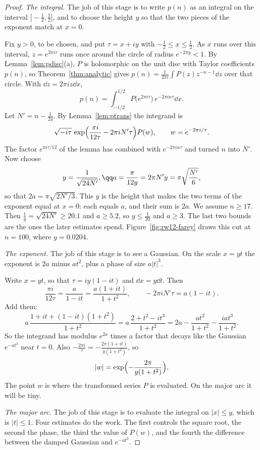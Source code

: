 \begin{proof}
\emph{The integral.} The job of this stage is to write $p(n)$ as an integral on the interval $\bigl[-\frac12,\frac12\bigr]$, and to choose the height $y$ so that the two pieces of the exponent match at $x=0$.

Fix $y>0$, to be chosen, and put $\tau=x+iy$ with $-\frac12\le x\le\frac12$. As $x$ runs over this interval, $z=e^{2\pi i\tau}$ runs once around the circle of radius $e^{-2\pi y}<1$. By Lemma~\ref{lem:pdisc}(a), $P$ is holomorphic on the unit disc with Taylor coefficients $p(n)$, so Theorem~\ref{thm:analytic} gives $p(n)=\frac1{2\pi i}\int P(z)z^{-n-1}\dd z$ over that circle. With $\dd z=2\pi iz\dd x$,
\[
p(n)=\int_{-1/2}^{1/2}P\bigl(e^{2\pi i\tau}\bigr)\,e^{-2\pi in\tau}\dd x.
\]
Let $N'=n-\frac1{24}$. By Lemma~\ref{lem:ptrans} the integrand is
\[
\sqrt{-i\tau}\,\exp\Bigl(\frac{\pi i}{12\tau}-2\pi iN'\tau\Bigr)P(w),\qquad w=e^{-2\pi i/\tau}.
\]
The factor $e^{\pi i\tau/12}$ of the lemma has combined with $e^{-2\pi in\tau}$ and turned $n$ into $N'$. Now choose
\[
y=\frac1{\sqrt{24N'}},\qq a=\frac\pi{12y}=2\pi N'y=\pi\sqrt{\frac{N'}6},
\]
so that $2a=\pi\sqrt{2N'/3}$. This $y$ is the height that makes the two terms of the exponent equal at $x=0$: each equals $a$, and their sum is $2a$. We assume $n\ge17$. Then $\frac1y=\sqrt{24N'}\ge20.1$ and $a\ge5.2$, so $y\le\frac1{20}$ and $a\ge3$. The last two bounds are the ones the later estimates spend. Figure~\ref{fig:rw12-farey} draws this cut at $n=100$, where $y=0.0204$.

\emph{The exponent.} The job of this stage is to see a Gaussian. On the scale $x=yt$ the exponent is $2a$ minus $at^2$, plus a phase of size $a|t|^3$.

Write $x=yt$, so that $\tau=iy(1-it)$ and $\dd x=y\dd t$. Then
\[
\frac{\pi i}{12\tau}=\frac a{1-it}=\frac{a(1+it)}{1+t^2},\qquad-2\pi iN'\tau=a(1-it).
\]
Add them:
\[
a\,\frac{1+it+(1-it)(1+t^2)}{1+t^2}=a\,\frac{2+t^2-it^3}{1+t^2}=2a-\frac{at^2}{1+t^2}-\frac{iat^3}{1+t^2}.
\]
So the integrand has modulus $e^{2a}$ times a factor that decays like the Gaussian $e^{-at^2}$ near $t=0$. Also $-\frac{2\pi i}\tau=-\frac{2\pi(1+it)}{y(1+t^2)}$, so
\[
|w|=\exp\Bigl(-\frac{2\pi}{y(1+t^2)}\Bigr).
\]
The point $w$ is where the transformed series $P$ is evaluated. On the major arc it will be tiny.

\emph{The major arc.} The job of this stage is to evaluate the integral on $|x|\le y$, which is $|t|\le1$. Four estimates do the work. The first controls the square root, the second the phase, the third the value of $P(w)$, and the fourth the difference between the damped Gaussian and $e^{-at^2}$.


\end{proof}
